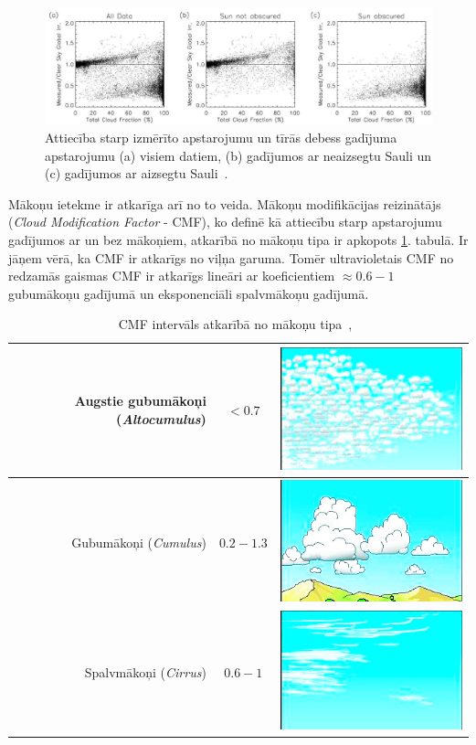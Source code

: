 \begin{figure}[h]
	\centering
	\includegraphics[width=\linewidth]{figures/misc/makoni_ietekme.jpg}
	\caption{Attiecība starp izmērīto apstarojumu un tīrās debess gadījuma apstarojumu (a) visiem datiem, (b) gadījumos ar neaizsegtu Sauli un (c) gadījumos ar aizsegtu Sauli~\cite{CloudCoverageImpactOnIrradiance}.}
	\label{fig:makoni_ietekme}
\end{figure}

Mākoņu ietekme ir atkarīga arī no to veida. Mākoņu modifikācijas reizinātājs (\textit{Cloud Modification Factor} - CMF), ko definē kā attiecību starp apstarojumu gadījumos ar un bez mākoņiem, atkarībā no mākoņu tipa ir apkopots \ref{tab:CMF}. tabulā. Ir jāņem vērā, ka CMF ir atkarīgs no viļņa garuma. Tomēr ultravioletais CMF no redzamās gaismas CMF ir atkarīgs lineāri ar koeficientiem $\approx0.6-1$ gubumākoņu gadījumā un eksponenciāli spalvmākoņu gadījumā.

\begin{table}[h]
	\caption{CMF intervāls atkarībā no mākoņu tipa~\cite{effectCloudsOnSurface},~\cite{cloudAtlas}}
	\begin{center}
		\begin{tabular}{| r | c | c |}
			\hline
			Augstie gubumākoņi (\textit{Altocumulus}) & $<0.7$ & \includegraphics[width=0.1\linewidth]{figures/meteo/cloud_Altocumulus.jpg} \\ \hline
			Gubumākoņi (\textit{Cumulus})        & $0.2-1.3$ & \includegraphics[width=0.1\linewidth]{figures/meteo/cloud_Cumulus.jpg} \\ \hline
			Spalvmākoņi (\textit{Cirrus})        & $0.6-1$  & \includegraphics[width=0.1\linewidth]{figures/meteo/cloud_Cirrus.jpg} \\ \hline
		\end{tabular}
	\end{center}
	\label{tab:CMF}
\end{table}

